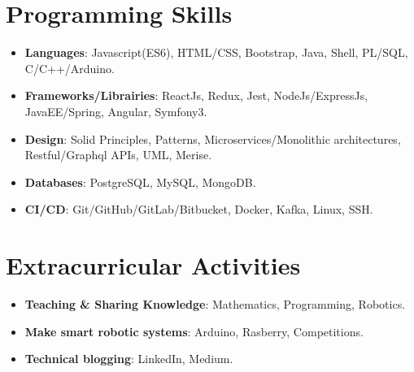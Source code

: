 \documentclass[letterpaper,11pt]{article}
\newcommand{\resumeSubHeadingListStart}{\begin{itemize}[leftmargin=*]}
\newcommand{\resumeSubHeadingListEnd}{\end{itemize}}
\begin{document}
\section{Programming Skills}
\resumeSubHeadingListStart
\item{\textbf{Languages}{: Javascript(ES6), HTML/CSS, Bootstrap, Java, Shell, PL/SQL, C/C++/Arduino.}}\vspace{-4pt}
\item{\textbf{Frameworks/Librairies}{: ReactJs, Redux, Jest, NodeJs/ExpressJs, JavaEE/Spring, Angular, Symfony3.}}\vspace{-6pt}
\item{\textbf{Design}{: Solid Principles, Patterns, Microservices/Monolithic architectures, Restful/Graphql APIs, UML, Merise.}}\vspace{-6pt}
\item{\textbf{Databases}{: PostgreSQL, MySQL, MongoDB. }}\vspace{-6pt}
\item{\textbf{CI/CD}{: Git/GitHub/GitLab/Bitbucket, Docker, Kafka, Linux, SSH.}}\vspace{-6pt}
\resumeSubHeadingListEnd

\section{Extracurricular Activities}
\resumeSubHeadingListStart
\item{\textbf{Teaching \& Sharing Knowledge}{: Mathematics, Programming, Robotics. }}\vspace{-4pt}
\item{\textbf{Make smart robotic systems}{: Arduino, Rasberry, Competitions.}}\vspace{-4pt}
\item{\textbf{Technical blogging}{: LinkedIn, Medium.}}\vspace{-4pt}
\resumeSubHeadingListEnd
\end{document}
